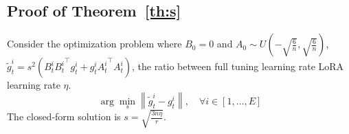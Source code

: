 \subsection{Proof of Theorem~\ref{th:s}}
\begin{tcolorbox}[colback=gray!20,colframe=gray]
\begin{Theorem2}[3.5]
Consider the optimization problem where \( B_0 = 0 \) and \( A_0 \sim U\left(-\sqrt{\frac{6}{n}}, \sqrt{\frac{6}{n}}\right) \), $\tilde{g}_t^i = s^2 \left( B_t^i {B_t^i}^\top g_t^i + g_t^i {A_t^i}^\top A_t^i \right)$, the ratio between full tuning learning rate \vs LoRA learning rate $\eta$. 
\begin{equation}
    \arg\min_{s} \left\| \tilde{g}_t^i - g_t^i \right\|, \quad \forall i \in [1, \dots, E]
\end{equation}
The closed-form solution is \( s = \sqrt{\frac{3n\eta}{r}} \).
\end{Theorem2}
\end{tcolorbox}

